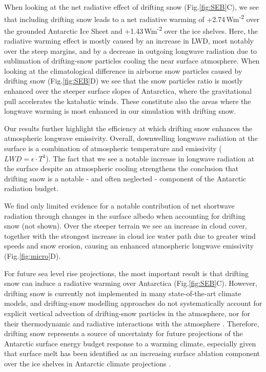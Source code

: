 \documentclass[draft]{agujournal2019}
\begin{document}

When looking at the net radiative effect of drifting snow (Fig.\ref{fig:SEB}C), we see that including drifting snow leads to a net radiative warming of +2.74\,Wm\textsuperscript{-2} over the grounded Antarctic Ice Sheet and +1.43\,Wm\textsuperscript{-2} over the ice shelves. Here, the radiative warming effect is mostly caused by an increase in LWD, most notably over the steep margins, and by a decrease in outgoing longwave radiation due to sublimation of drifting-snow particles cooling the near surface atmosphere. When looking at the climatological difference in airborne snow particles caused by drifting snow (Fig.\ref{fig:SEB}D) we see that the snow particles ratio is mostly enhanced over the steeper surface slopes of Antarctica, where the gravitational pull accelerates the katabatic winds. These constitute also the areas where the longwave warming is most enhanced in our simulation with drifting snow.

Our results further highlight the efficiency at which drifting snow enhances the atmospheric longwave emissivity. Overall, downwelling longwave radiation at the surface is a combination of atmospheric temperature and emissivity ($LWD=\epsilon\cdot T^{4}$). The fact that we see a notable increase in longwave radiation at the surface despite an atmospheric cooling strengthens the conclusion that drifting snow is a notable - and often neglected - component of the Antarctic radiation budget.

We find only limited evidence for a notable contribution of net shortwave radiation through changes in the surface albedo when accounting for drifting snow (not shown). Over the steeper terrain we see an increase in cloud cover, together with the strongest increase in cloud ice water path due to greater wind speeds and snow erosion, causing an enhanced atmospheric longwave emissivity (Fig.\ref{fig:micro}D).

For future sea level rise projections, the most important result is that drifting snow can induce a radiative warming over Antarctica (Fig.\ref{fig:SEB}C). However, drifting snow is currently not implemented in many state-of-the-art climate models, and drifting-snow modelling approaches do not systematically account for explicit vertical advection of drifting-snow particles in the atmosphere, nor for their thermodynamic and radiative interactions with the atmosphere \cite{Lenaerts2012a}. Therefore, drifting snow represents a source of uncertainty for future projections of the Antarctic surface energy budget response to a warming climate, especially given that surface melt has been identified as an increasing surface ablation component over the ice shelves in Antarctic climate projections \cite{Kittel2021}.
\end{document}
